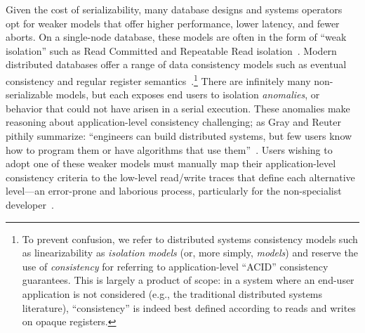
Given the cost of serializability, many database designs and systems
operators opt for weaker models that offer higher performance, lower
latency, and fewer aborts. On a single-node database, these models are
often in the form of ``weak isolation'' such as Read Committed and
Repeatable Read isolation~\cite{adya-isolation}. Modern distributed
databases offer a range of data consistency models such as eventual
consistency and regular register
semantics~\cite{hat-vldb}.\footnote{To prevent confusion, we refer to
  distributed systems consistency models such as linearizability as
  \textit{isolation models} (or, more simply, \textit{models}) and
  reserve the use of \textit{consistency} for referring to
  application-level ``ACID'' consistency guarantees. This is largely a
  product of scope: in a system where an end-user application is not
  considered (e.g., the traditional distributed systems literature),
  ``consistency'' is indeed best defined according to reads and writes
  on opaque registers.}  There are infinitely many non-serializable
models, but each exposes end users to isolation \textit{anomalies}, or
behavior that could not have arisen in a serial execution. These
anomalies make reasoning about application-level consistency
challenging; as Gray and Reuter pithily summarize: ``engineers can
build distributed systems, but few users know how to program them or
have algorithms that use them''~\cite{gray-book}. Users wishing to
adopt one of these weaker models must manually map their
application-level consistency criteria to the low-level read/write
traces that define each alternative level---an error-prone and
laborious process, particularly for the non-specialist
developer~\cite{consistency-borders}.


